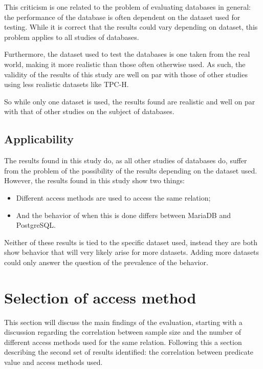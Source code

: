 This criticism is one related to the problem of evaluating databases in general:
the performance of the database is often dependent on the dataset used for
testing. While it is correct that the results could vary depending on dataset,
this problem applies to all studies of databases.

Furthermore, the dataset used to test the databases is one taken from the real
world, making it more realistic than those often otherwise used. As such, the
validity of the results of this study are well on par with those of other
studies using less realistic datasets like TPC-H.

So while only one dataset is used, the results found are realistic and well on
par with that of other studies on the subject of databases.

\subsection{Applicability}
The results found in this study do, as all other studies of databases do, suffer
from the problem of the possibility of the results depending on the dataset
used. However, the results found in this study show two things:
\begin{itemize}
\item Different access methods are used to access the same relation;
\item And the behavior of when this is done differs between MariaDB and
  PostgreSQL.\@
\end{itemize}

Neither of these results is tied to the specific dataset used, instead they are
both show behavior that will very likely arise for more datasets. Adding more
datasets could only answer the question of the prevalence of the behavior.

\section{Selection of access method}\label{sec:accessmethods}
This section will discuss the main findings of the evaluation, starting with a
discussion regarding the correlation between sample size and the number of
different access methods used for the same relation. Following this a section
describing the second set of results identified: the correlation between
predicate value and access methods used.

